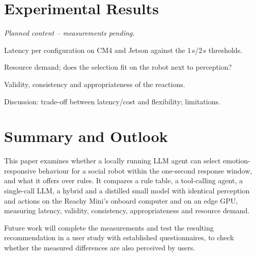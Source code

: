\documentclass[conference]{IEEEtran}
\begin{document}
\section{Experimental Results}
\textit{Planned content -- measurements pending.}
\begin{points}
    \item Latency per configuration on CM4 and Jetson against the 1\,s/2\,s thresholds.
    \item Resource demand; does the selection fit on the robot next to perception?
    \item Validity, consistency and appropriateness of the reactions.
    \item Discussion: trade-off between latency/cost and flexibility; limitations.
\end{points}

\section{Summary and Outlook}

This paper examines whether a locally running LLM agent can select
emotion-responsive behaviour for a social robot within the one-second
response window, and what it offers over rules. It compares a rule table, a
tool-calling agent, a single-call LLM, a hybrid and a distilled small model
with identical perception and actions on the Reachy Mini's onboard computer
and on an edge GPU, measuring latency, validity, consistency,
appropriateness and resource demand.

Future work will complete the measurements and test the resulting
recommendation in a user study with established questionnaires,
to check whether the measured differences are also perceived by users.

{\small


}
\end{document}
